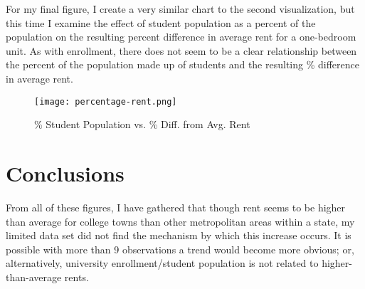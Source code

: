 \documentclass[12pt]{article}
\begin{document}
For my final figure, I create a very similar chart to the second visualization, but this time I examine the effect of student population as a percent of the population on the resulting percent difference in average rent for a one-bedroom unit. As with enrollment, there does not seem to be a clear relationship between the percent of the population made up of students and the resulting \% difference in average rent. 

\begin{figure}[H]
    \centering
    \texttt{[image: percentage-rent.png]}
    \caption{\% Student Population vs. \% Diff. from Avg. Rent}
    \label{fig:enter-label}
\end{figure}

\section*{\small{Conclusions}}
From all of these figures, I have gathered that though rent seems to be higher than average for college towns than other metropolitan areas within a state, my limited data set did not find the mechanism by which this increase occurs. It is possible with more than 9 observations a trend would become more obvious; or, alternatively, university enrollment/student population is not related to higher-than-average rents. 
\end{document}

